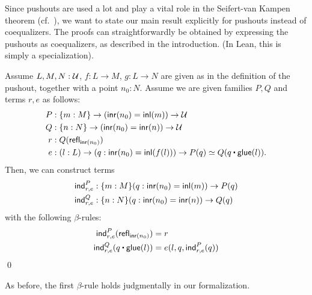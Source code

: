 Since pushouts are used a lot and play a vital role in the Seifert-van Kampen theorem 
(cf.~),
we want to state our main result explicitly for pushouts instead of coequalizers.
The proofs can straightforwardly be obtained by expressing the pushouts as coequalizers,
as described in the introduction. (In Lean, this is simply a specialization).

\begin{thm} \label{thm:paths-main-pushout}
 Assume $L, M, N : \mathcal{U}$, $f : L \to M$, $g : L \to N$ are given as in the
 definition of the pushout,
 together with a point $n_0 : N$.
 Assume we are given families $P, Q$ and terms $r,e$ as follows:
 \begin{align}
  P &: \{m : M\} \to (\inr(n_0) = \inl(m)) \to \UU \label{eq:P-mainresult-pushout}\\
  Q &: \{n : N\} \to (\inr(n_0) = \inr(n)) \to \UU \label{eq:Q-mainresult-pushout} \\
  r &: Q(\refl_{\inr(n_0)}) \label{eq:r-mainresult-pushout} \\
  e &: (l : L) \to (q: \inr(n_0) = \inl(f(l)))
       \to P(q) \simeq Q(q \ct \glue(l)). \label{eq:e-mainresult-pushout}
 \end{align}
 Then, we can construct terms
 \begin{align*}
  \mathsf{ind}^P_{r,e} &: \{m : M\}(q : \mathsf{inr}(n_0) = \mathsf{inl}(m)) \to P(q) \\
  \mathsf{ind}^Q_{r,e} &: \{n : N\}(q : \mathsf{inr}(n_0) = \mathsf{inr}(n)) \to Q(q)
 \end{align*}
 with the following $\beta$-rules:
 \begin{align*}
  \mathsf{ind}^P_{r,e} (\refl_{\inr(n_0)}) &= r \\
  \mathsf{ind}^Q_{r,e}(q \ct \glue(l)) &= e (l,q,\mathsf{ind}^P_{r,e}(q))
 \end{align*}
 \qed
\end{thm}

\begin{remark}
 As before, the first $\beta$-rule
holds judgmentally in our formalization.
\end{remark}


